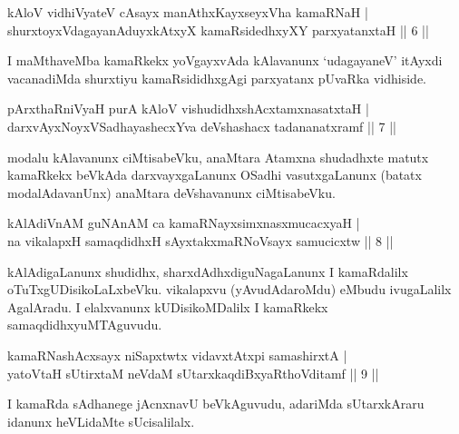 
\begin{shl}
kAloV vidhiVyateV cAsayx manAthxKayxseyxVha kamaRNaH | \\
shurxtoyxVdagayanAduyxkAtxyX kamaRsidedhxyXY parxyatanxtaH \hfill|| 6 || 
\end{shl}

\begin{artha}
I maMthaveMba kamaRkekx yoVgayxvAda kAlavanunx `udagayaneV' itAyxdi vacanadiMda shurxtiyu kamaRsididhxgAgi parxyatanx pUvaRka vidhiside.
\end{artha}


\begin{shl}
pArxthaRniVyaH purA kAloV vishudidhxshAcx\s \s tamxnasatxtaH | \\
darxvAyxNoyxVSadhayashecxYva deVshashacx tadananatxramf \hfill|| 7 || 
\end{shl}

\begin{artha}
modalu kAlavanunx ciMtisabeVku, anaMtara Atamxna shudadhxte matutx kamaRkekx beVkAda darxvayxgaLanunx OSadhi vasutxgaLanunx (batatx modalAdavanUnx) anaMtara deVshavanunx ciMtisabeVku.
\end{artha}

\begin{shl}
kAlAdiVnAM guNAnAM ca kamaRNayxsimxnasxmucacxyaH | \\
na vikalapxH samaqdidhxH sAyxtakxmaRNoV\s sayx samucicxtw \hfill|| 8 || 
\end{shl}

\begin{artha}
kAlAdigaLanunx shudidhx, sharxdAdhxdiguNagaLanunx I kamaRdalilx oTuTxgUDisikoLaLx\-beVku. vikalapxvu (yAvudAdaroMdu) eMbudu ivugaLalilx AgalAradu. I elalxvanunx kUDisikoMDalilx I kamaRkekx samaqdidhxyuMTAguvudu.
\end{artha}


\begin{shl}
kamaRNashAcxsayx niSapxtwtx vidavxtAtx\s pi samashirxtA | \\
yatoV\s taH sUtirxtaM neVdaM sUtarxkaqdiBxyaRthoVditamf \hfill|| 9 || 
\end{shl}

\begin{artha}
I kamaRda sAdhanege jAcnxnavU beVkAguvudu, adariMda sUtarxkAraru idanunx heVLidaMte sUcisalilalx.
\end{artha}

